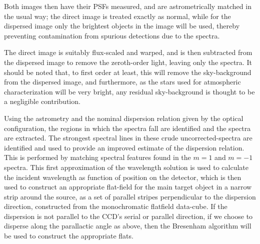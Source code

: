 Both images then have their PSFs measured, and are astrometrically matched in the usual way; the direct image is treated exactly as normal, while for the dispersed image only the brightest objects in the image will be used, thereby preventing contamination from spurious detections due to the spectra.

The direct image is suitably flux-scaled and warped, and is then subtracted from the dispersed image to remove the zeroth-order light, leaving only the spectra. It should be noted that, to first order at least, this will remove the sky-background from the dispersed image, and furthermore, as the stars used for atmospheric characterization will be very bright, any residual sky-background is thought to be a negligible contribution.

Using the astrometry and the nominal dispersion relation given by the optical configuration, the regions in which the spectra fall are identified and the spectra are extracted. The strongest spectral lines in these crude uncorrected-spectra are identified and used to provide an improved estimate of the dispersion relation. This is performed by matching spectral features found in the $m=1$ and $m=-1$ spectra. This first approximation of the wavelength solution is used to calculate the incident wavelength as function of position on the detector, which is then used to construct an appropriate flat-field for the main target object in a narrow strip around the source, as a set of parallel stripes perpendicular to the dispersion direction, constructed from the monochromatic flatfield data-cube. If the dispersion is not parallel to the CCD's serial or parallel direction, \ie if we choose to disperse along the parallactic angle as above, then the Bresenham algorithm will be used to construct the appropriate flats.

